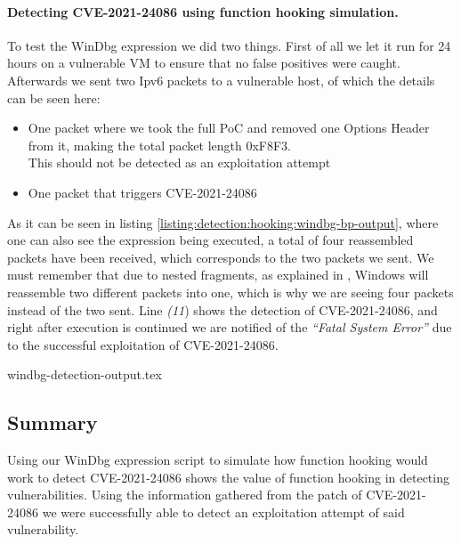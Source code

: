 \documentclass{report}
\begin{document}
\paragraph{Detecting CVE-2021-24086 using function hooking simulation.} To test the WinDbg expression we did two things. First of all we let it run for 24 hours on a vulnerable VM to ensure that no false positives were caught. Afterwards we sent two Ipv6 packets to a vulnerable host, of which the details can be seen here:
\begin{itemize}
    \item One packet where we took the full PoC and removed one Options Header from it, making the total packet length 0xF8F3.\\This should not be detected as an exploitation attempt
    \item One packet that triggers CVE-2021-24086
\end{itemize}

As it can be seen in listing \ref{listing:detection:hooking:windbg-bp-output}, where one can also see the expression being executed, a total of four reassembled packets have been received, which corresponds to the two packets we sent. We must remember that due to nested fragments, as explained in , Windows will reassemble two different packets into one, which is why we are seeing four packets instead of the two sent. Line \emph{(11}) shows the detection of CVE-2021-24086, and right after execution is continued we are notified of the \emph{``Fatal System Error''} due to the successful exploitation of CVE-2021-24086.

{windbg-detection-output.tex}

\subsection{Summary}

Using our WinDbg expression script to simulate how function hooking would work to detect CVE-2021-24086 shows the value of function hooking in detecting vulnerabilities. Using the information gathered from the patch of CVE-2021-24086 we were successfully able to detect an exploitation attempt of said vulnerability.
\end{document}
